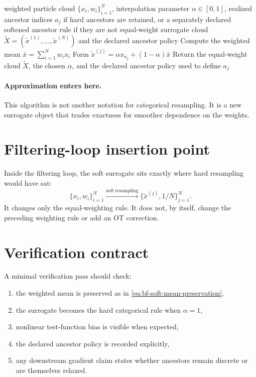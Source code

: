 \begin{algorithm}[ht]
\caption{\texttt{soft\_resampling\_step}}
\begin{algorithmic}[1]
\Require weighted particle cloud \(\{x_i,w_i\}_{i=1}^N\), interpolation parameter \(\alpha\in[0,1]\), realized ancestor indices \(a_j\) if hard ancestors are retained, or a separately declared softened ancestor rule if they are not
\Ensure equal-weight surrogate cloud \(\widetilde X=(\tilde x^{(1)},\ldots,\tilde x^{(N)})\) and the declared ancestor policy
\State Compute the weighted mean \(\bar x = \sum_{i=1}^N w_i x_i\)
  \State Form \(\tilde x^{(j)} = \alpha x_{a_j} + (1-\alpha)\bar x\)
\EndFor
\State Return the equal-weight cloud \(\widetilde X\), the chosen \(\alpha\), and the declared ancestor policy used to define \(a_j\)
\end{algorithmic}
\end{algorithm}

\paragraph{Approximation enters here.}
This algorithm is not another notation for categorical resampling.  It is a new
surrogate object that trades exactness for smoother dependence on the weights.

\section{Filtering-loop insertion point}
\label{sec:bf-soft-loop}

Inside the filtering loop, the soft surrogate sits exactly where hard resampling
would have sat:
\begin{equation}
\label{eq:bf-soft-loop}
  \{x_i,w_i\}_{i=1}^N
  \xrightarrow{\mathrm{soft\ resampling}}
  \{\tilde x^{(j)},1/N\}_{j=1}^N.
\end{equation}
It changes only the equal-weighting rule.  It does not, by itself, change the
preceding weighting rule or add an OT correction.

\section{Verification contract}
\label{sec:bf-soft-verification}

A minimal verification pass should check:
\begin{enumerate}[label=(\arabic*)]
  \item the weighted mean is preserved as in
  \eqref{eq:bf-soft-mean-preservation},
  \item the surrogate becomes the hard categorical rule when \(\alpha=1\),
  \item nonlinear test-function bias is visible when expected,
  \item the declared ancestor policy is recorded explicitly,
  \item any downstream gradient claim states whether ancestors remain discrete or
  are themselves relaxed.
\end{enumerate}

